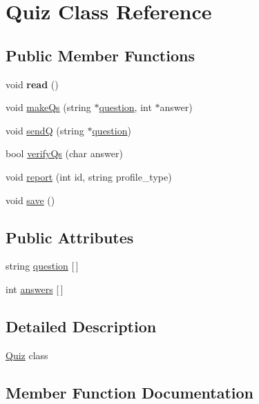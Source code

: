 \hypertarget{class_quiz}{}\section{Quiz Class Reference}
\label{class_quiz}
\subsection*{Public Member Functions}
\begin{DoxyCompactItemize}
\item 
\hypertarget{class_quiz_a585d5f112cbf72932fff7983c1e5b2c9}{}void {\bfseries read} ()\label{class_quiz_a585d5f112cbf72932fff7983c1e5b2c9}

\item 
void \hyperlink{class_quiz_a318cf3e77db0c2a994752ef0541792bf}{make\+Qs} (string $\ast$\hyperlink{class_quiz_a8d26a1bec061915e1095808386fa64f6}{question}, int $\ast$answer)
\item 
void \hyperlink{class_quiz_a31824f4cb143442fb30d05d5193e6e90}{send\+Q} (string $\ast$\hyperlink{class_quiz_a8d26a1bec061915e1095808386fa64f6}{question})
\item 
bool \hyperlink{class_quiz_a04872049618df0469f083b226f68eb16}{verify\+Qs} (char answer)
\item 
void \hyperlink{class_quiz_aefcae0c2187864f7764e3a2cc536f723}{report} (int id, string profile\+\_\+type)
\item 
void \hyperlink{class_quiz_a2a30f1d27f8a873dedbf4a19c4143f31}{save} ()
\end{DoxyCompactItemize}
\subsection*{Public Attributes}
\begin{DoxyCompactItemize}
\item 
string \hyperlink{class_quiz_a8d26a1bec061915e1095808386fa64f6}{question} \mbox{[}$\,$\mbox{]}
\item 
int \hyperlink{class_quiz_a19d4b1d98b6ae6cebda04923b37e2aaf}{answers} \mbox{[}$\,$\mbox{]}
\end{DoxyCompactItemize}


\subsection{Detailed Description}
\hyperlink{class_quiz}{Quiz} class 

\subsection{Member Function Documentation}
\hypertarget{class_quiz_a318cf3e77db0c2a994752ef0541792bf}{}
